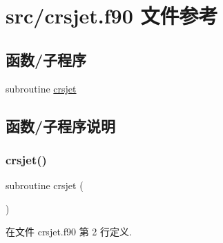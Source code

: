 \hypertarget{crsjet_8f90}{}\section{src/crsjet.f90 文件参考}
\label{crsjet_8f90}
\subsection*{函数/子程序}
\begin{DoxyCompactItemize}
\item 
subroutine \mbox{\hyperlink{crsjet_8f90_af2fc33e94c1b4d97324c05704f5e1130}{crsjet}}
\end{DoxyCompactItemize}


\subsection{函数/子程序说明}
\mbox{\label{crsjet_8f90_af2fc33e94c1b4d97324c05704f5e1130}} 
\subsubsection{\texorpdfstring{crsjet()}{crsjet()}}
{\footnotesize\ttfamily subroutine crsjet (\begin{DoxyParamCaption}{ }\end{DoxyParamCaption})}



在文件 crsjet.\+f90 第 2 行定义.

